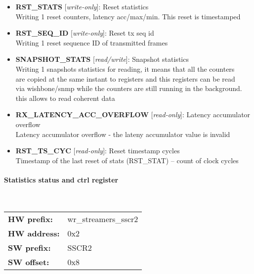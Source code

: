 \begin{itemize}
\item \begin{small}
{\bf 
RST\_STATS
} [\emph{write-only}]: Reset statistics
\\
Writing 1 reset counters, latency acc/max/min. This reset is timestamped
\end{small}
\item \begin{small}
{\bf 
RST\_SEQ\_ID
} [\emph{write-only}]: Reset tx seq id
\\
Writing 1 reset sequence ID of transmitted frames
\end{small}
\item \begin{small}
{\bf 
SNAPSHOT\_STATS
} [\emph{read/write}]: Snapshot statistics
\\
Writing 1 snapshots statistics for reading, it means that all the counters \\                    are copied at the same instant to registers and this registers can be read\\                    via wishbone/snmp while the counters are still running in the background. \\                    this allows to read coherent data
\end{small}
\item \begin{small}
{\bf 
RX\_LATENCY\_ACC\_OVERFLOW
} [\emph{read-only}]: Latency accumulator overflow
\\
Latency accumulator overflow - the lateny accumulator value is invalid
\end{small}
\item \begin{small}
{\bf 
RST\_TS\_CYC
} [\emph{read-only}]: Reset timestamp cycles
\\
Timestamp of the last reset of stats (RST\_STAT) -- count of clock cycles
\end{small}
\end{itemize}
\paragraph*{Statistics status and ctrl register}\mbox{}\\\vskip 6pt
\begin{tabular}{l l }
{\bf HW prefix:}  & wr\_streamers\_sscr2\\
{\bf HW address:}  & 0x2\\
{\bf SW prefix:}  & SSCR2\\
{\bf SW offset:}  & 0x8\\
\end{tabular}


